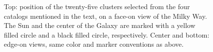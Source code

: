 \documentclass{aa}
\begin{document}
 \begin{figure}
  \caption{Top: position of the twenty-five clusters selected from the four
  catalogs mentioned in the text, on a face-on view of the Milky Way. The Sun
  and the center of the Galaxy are marked with a yellow filled circle and a
  black filled circle, respectively. Center and bottom: edge-on views, same
  color and marker conventions as above.}
  \label{fig:MWmap}
 \end{figure}
\end{document}

